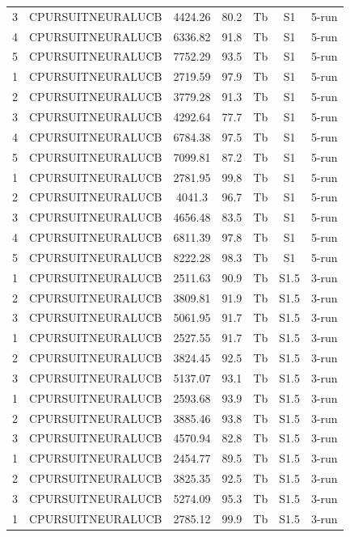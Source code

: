 \documentclass[11pt]{article}
\begin{document}
\begin{center}
\begin{longtable}{|c|c|c|c|c|c|c|}
3 & CPURSUITNEURALUCB & 4424.26 & 80.2 & Tb & S1 & 5-run \\
4 & CPURSUITNEURALUCB & 6336.82 & 91.8 & Tb & S1 & 5-run \\
5 & CPURSUITNEURALUCB & 7752.29 & 93.5 & Tb & S1 & 5-run \\
1 & CPURSUITNEURALUCB & 2719.59 & 97.9 & Tb & S1 & 5-run \\
2 & CPURSUITNEURALUCB & 3779.28 & 91.3 & Tb & S1 & 5-run \\
3 & CPURSUITNEURALUCB & 4292.64 & 77.7 & Tb & S1 & 5-run \\
4 & CPURSUITNEURALUCB & 6784.38 & 97.5 & Tb & S1 & 5-run \\
5 & CPURSUITNEURALUCB & 7099.81 & 87.2 & Tb & S1 & 5-run \\
1 & CPURSUITNEURALUCB & 2781.95 & 99.8 & Tb & S1 & 5-run \\
2 & CPURSUITNEURALUCB & 4041.3 & 96.7 & Tb & S1 & 5-run \\
3 & CPURSUITNEURALUCB & 4656.48 & 83.5 & Tb & S1 & 5-run \\
4 & CPURSUITNEURALUCB & 6811.39 & 97.8 & Tb & S1 & 5-run \\
5 & CPURSUITNEURALUCB & 8222.28 & 98.3 & Tb & S1 & 5-run \\
1 & CPURSUITNEURALUCB & 2511.63 & 90.9 & Tb & S1.5 & 3-run \\
2 & CPURSUITNEURALUCB & 3809.81 & 91.9 & Tb & S1.5 & 3-run \\
3 & CPURSUITNEURALUCB & 5061.95 & 91.7 & Tb & S1.5 & 3-run \\
1 & CPURSUITNEURALUCB & 2527.55 & 91.7 & Tb & S1.5 & 3-run \\
2 & CPURSUITNEURALUCB & 3824.45 & 92.5 & Tb & S1.5 & 3-run \\
3 & CPURSUITNEURALUCB & 5137.07 & 93.1 & Tb & S1.5 & 3-run \\
1 & CPURSUITNEURALUCB & 2593.68 & 93.9 & Tb & S1.5 & 3-run \\
2 & CPURSUITNEURALUCB & 3885.46 & 93.8 & Tb & S1.5 & 3-run \\
3 & CPURSUITNEURALUCB & 4570.94 & 82.8 & Tb & S1.5 & 3-run \\
1 & CPURSUITNEURALUCB & 2454.77 & 89.5 & Tb & S1.5 & 3-run \\
2 & CPURSUITNEURALUCB & 3825.35 & 92.5 & Tb & S1.5 & 3-run \\
3 & CPURSUITNEURALUCB & 5274.09 & 95.3 & Tb & S1.5 & 3-run \\
1 & CPURSUITNEURALUCB & 2785.12 & 99.9 & Tb & S1.5 & 3-run \\

\end{longtable}
\end{center}
\end{document}

